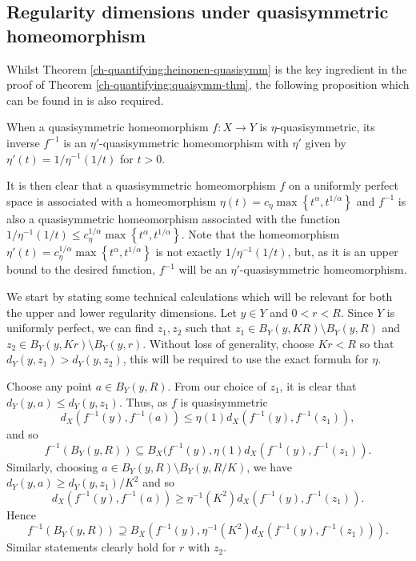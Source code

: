 \subsection{Regularity dimensions under quasisymmetric homeomorphism}\label{ch-quantifying:proof-quasi}


Whilst Theorem \ref{ch-quantifying:heinonen-quasisymm} is the key ingredient in the proof of Theorem \ref{ch-quantifying:quaisymm-thm}, the following proposition which can be found in \cite{heinonen} is also required.

\begin{proposition}
	When a quasisymmetric homeomorphism $f\colon X \rightarrow Y$ is $\eta$-quasisymmetric, its inverse $f^{-1}$ is an $\eta'$-quasisymmetric homeomorphism with $\eta'$ given by  $\eta'(t) = 1/\eta^{-1}(1/t)$ for $t>0$.
\end{proposition}

It is then clear that a quasisymmetric homeomorphism $f$ on a uniformly perfect space is associated with a homeomorphism $\eta(t) = c_\eta\max\left\{t^\alpha, t^{1/\alpha}\right\}$ and $f^{-1}$ is also a quasisymmetric homeomorphism associated with the function $1/\eta^{-1}(1/t) \le c_\eta^{1/\alpha} \max\left\{t^\alpha, t^{1/\alpha} \right\}$. Note that the homeomorphism $\eta'(t) = c_\eta^{1/\alpha} \max\left\{t^\alpha, t^{1/\alpha} \right\}$ is not exactly $1/\eta^{-1}(1/t)$, but, as it is an upper bound to the desired function, $f^{-1}$ will be an $\eta'$-quasisymmetric homeomorphism.



We start by stating some technical calculations which will be relevant for both the upper and lower regularity dimensions. Let $y\in Y$ and $0<r<R$. Since $Y$ is uniformly perfect, we can find $z_1,z_2$ such that $z_1\in B_Y(y,KR) \setminus B_Y(y,R)$ and $z_2 \in B_Y(y,Kr) \setminus B_Y(y,r)$. Without loss of generality, choose $ Kr < R $ so that $d_Y(y,z_1) > d_Y(y,z_2)$,  this will be required to use the exact formula for $\eta$.
	
	
Choose any point $a \in B_Y(y,R)$. From our choice of $z_1$, it is clear that $d_Y( y , a ) \le d_Y(y , z_1)$. Thus, as $f$ is quasisymmetric 
$$d_X( f^{-1}(y) , f^{-1}(a) ) \le \eta(1)  d_X(f^{-1}(y) , f^{-1}(z_1)), $$
and so 
\[
f^{-1}(B_Y(y,R)) \subseteq B_X(f^{-1}(y),\eta(1)d_X(f^{-1}(y), f^{-1}(z_1)).
\]
Similarly, choosing $a \in B_Y(y,R) \setminus B_Y(y,R/K)$, we have $d_Y( y , a ) \ge d_Y( y , z_1 )/K^2$ and so $$d_X( f^{-1}(y) , f^{-1}(a) ) \ge \eta^{-1}(K^2) d_X( f^{-1}(y) , f^{-1}(z_1) ).$$
Hence 
\[
f^{-1}(B_Y(y,R)) \supseteq B_X(f^{-1}(y),\eta^{-1}(K^2)d_X(f^{-1}(y),f^{-1}(z_1))).
\]
Similar statements clearly hold for $r$ with $z_2$. 


